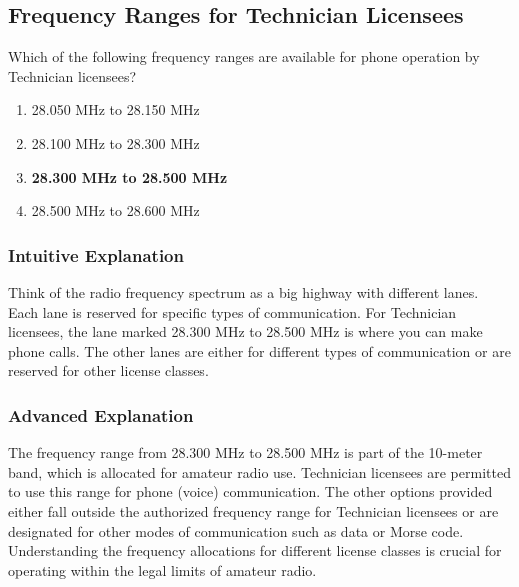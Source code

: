 \subsection{Frequency Ranges for Technician Licensees}
\label{T1B01}

\begin{tcolorbox}[colback=gray!10!white,colframe=black!75!black,title=T1B01]
Which of the following frequency ranges are available for phone operation by Technician licensees?
\begin{enumerate}[label=\Alph*),noitemsep]
    \item 28.050 MHz to 28.150 MHz
    \item 28.100 MHz to 28.300 MHz
    \item \textbf{28.300 MHz to 28.500 MHz}
    \item 28.500 MHz to 28.600 MHz
\end{enumerate}
\end{tcolorbox}

\subsubsection*{Intuitive Explanation}
Think of the radio frequency spectrum as a big highway with different lanes. Each lane is reserved for specific types of communication. For Technician licensees, the lane marked 28.300 MHz to 28.500 MHz is where you can make phone calls. The other lanes are either for different types of communication or are reserved for other license classes.

\subsubsection*{Advanced Explanation}
The frequency range from 28.300 MHz to 28.500 MHz is part of the 10-meter band, which is allocated for amateur radio use. Technician licensees are permitted to use this range for phone (voice) communication. The other options provided either fall outside the authorized frequency range for Technician licensees or are designated for other modes of communication such as data or Morse code. Understanding the frequency allocations for different license classes is crucial for operating within the legal limits of amateur radio.